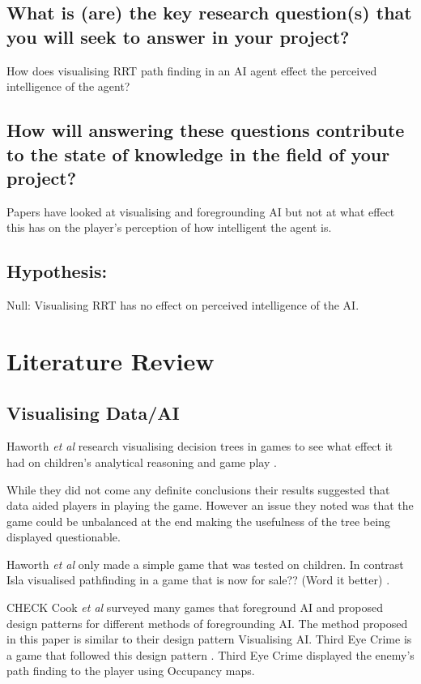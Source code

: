 \documentclass[journal]{IEEEtran}
\begin{document}
\subsection{What is (are) the key research question(s) that you will seek to answer in	your project?}
How does visualising RRT path finding in an AI agent effect the perceived intelligence of the agent?

\subsection{How will answering these questions contribute to the state of knowledge in the field of your project?}
Papers have looked at visualising and foregrounding AI but not at what effect this has on the player's perception of how intelligent the agent is.

\subsection{Hypothesis:}
Null: Visualising RRT has no effect on perceived intelligence of the AI.


\section{Literature Review}
\subsection{Visualising Data/AI}

Haworth \textit{et al} research visualising decision trees in games to see what effect it had on children's analytical reasoning and game play \cite{Haworth2010}. 

While they did not come any definite conclusions their results suggested that data aided players in playing the game. However an issue they noted was that the game could be unbalanced at the end making the usefulness of the tree being displayed questionable.  

Haworth \textit{et al} only made a simple game that was tested on children. In contrast Isla visualised pathfinding in a game that is now for sale?? (Word it better) \cite{Isla2014}.
 
 
 CHECK Cook \textit{et al} surveyed many games that foreground AI and proposed design patterns for different methods of foregrounding AI.  The method proposed in this paper is similar to their design pattern Visualising AI.  
 Third Eye Crime is a game that followed this design pattern \cite{Isla2014}.  Third Eye Crime displayed the enemy's path finding to the player using Occupancy maps. 
 
\end{document}
